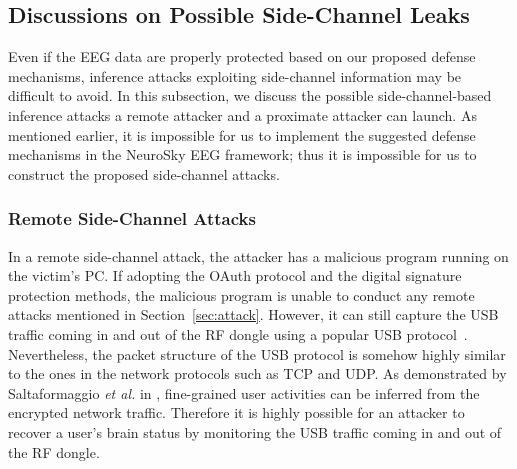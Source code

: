 

\subsection{Discussions on Possible Side-Channel Leaks}
Even if the EEG data are properly protected based on our proposed defense mechanisms, inference attacks exploiting side-channel information may be difficult to avoid. In this subsection, we discuss the possible side-channel-based inference attacks a remote attacker and a proximate attacker can launch. As mentioned earlier, it is impossible for us to implement the suggested defense mechanisms in the NeuroSky EEG framework; thus it is impossible for us to construct the proposed side-channel attacks. 

\subsubsection{Remote Side-Channel Attacks}
In a remote side-channel attack, the attacker has a malicious program running on the victim's PC. If adopting the OAuth protocol and the digital signature protection methods, the malicious program is unable to conduct any remote attacks mentioned in Section~\ref{sec:attack}. However, it can still capture the USB traffic coming in and out of the RF dongle using a popular USB protocol~\cite{usbprotocol}. Nevertheless, the packet structure of the USB protocol is somehow highly similar to the ones in the network protocols such as TCP and UDP. As demonstrated by Saltaformaggio \emph{et al.} in \cite{brendan2016}, fine-grained user activities can be inferred from the encrypted network traffic. Therefore it is highly possible for an attacker to recover a user's brain status by monitoring the USB traffic coming in and out of the RF dongle.

